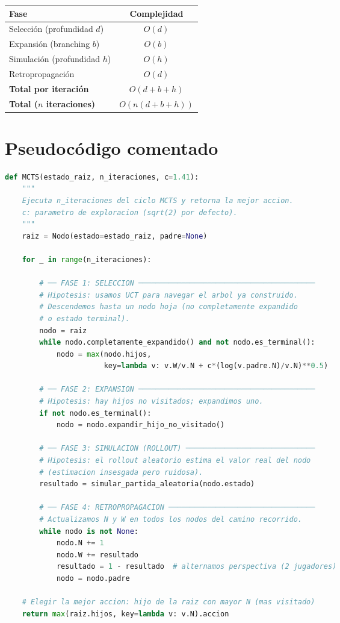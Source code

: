 \documentclass[12pt, a4paper]{article}
\begin{document}
\begin{center}
\begin{tabular}{lc}
\toprule
\textbf{Fase} & \textbf{Complejidad} \\
\midrule
Selección (profundidad $d$) & $O(d)$ \\
Expansión (branching $b$) & $O(b)$ \\
Simulación (profundidad $h$) & $O(h)$ \\
Retropropagación & $O(d)$ \\
\midrule
\textbf{Total por iteración} & $O(d + b + h)$ \\
\textbf{Total ($n$ iteraciones)} & $O(n(d + b + h))$ \\
\bottomrule
\end{tabular}
\end{center}

\section{Pseudocódigo comentado}

\begin{lstlisting}[language=Python, caption={MCTS — pseudocódigo en Python}]
def MCTS(estado_raiz, n_iteraciones, c=1.41):
    """
    Ejecuta n_iteraciones del ciclo MCTS y retorna la mejor accion.
    c: parametro de exploracion (sqrt(2) por defecto).
    """
    raiz = Nodo(estado=estado_raiz, padre=None)

    for _ in range(n_iteraciones):

        # ── FASE 1: SELECCION ─────────────────────────────────────────
        # Hipotesis: usamos UCT para navegar el arbol ya construido.
        # Descendemos hasta un nodo hoja (no completamente expandido
        # o estado terminal).
        nodo = raiz
        while nodo.completamente_expandido() and not nodo.es_terminal():
            nodo = max(nodo.hijos,
                       key=lambda v: v.W/v.N + c*(log(v.padre.N)/v.N)**0.5)

        # ── FASE 2: EXPANSION ─────────────────────────────────────────
        # Hipotesis: hay hijos no visitados; expandimos uno.
        if not nodo.es_terminal():
            nodo = nodo.expandir_hijo_no_visitado()

        # ── FASE 3: SIMULACION (ROLLOUT) ──────────────────────────────
        # Hipotesis: el rollout aleatorio estima el valor real del nodo
        # (estimacion insesgada pero ruidosa).
        resultado = simular_partida_aleatoria(nodo.estado)

        # ── FASE 4: RETROPROPAGACION ──────────────────────────────────
        # Actualizamos N y W en todos los nodos del camino recorrido.
        while nodo is not None:
            nodo.N += 1
            nodo.W += resultado
            resultado = 1 - resultado  # alternamos perspectiva (2 jugadores)
            nodo = nodo.padre

    # Elegir la mejor accion: hijo de la raiz con mayor N (mas visitado)
    return max(raiz.hijos, key=lambda v: v.N).accion
\end{lstlisting}
\end{document}
